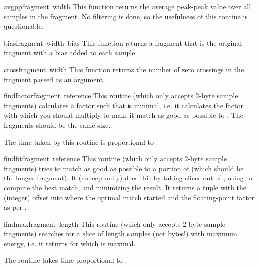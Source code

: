 \begin{funcdesc}{avgpp}{fragment\, width}
This function returns the average peak-peak value over all samples in
the fragment. No filtering is done, so the usefulness of this routine
is questionable.
\end{funcdesc}

\begin{funcdesc}{bias}{fragment\, width\, bias}
This function returns a fragment that is the original fragment with a
bias added to each sample.
\end{funcdesc}

\begin{funcdesc}{cross}{fragment\, width}
This function returns the number of zero crossings in the fragment
passed as an argument.
\end{funcdesc}

\begin{funcdesc}{findfactor}{fragment\, reference}
This routine (which only accepts 2-byte sample fragments) calculates a
factor  such that 
is minimal, i.e. it calculates the factor with which you should
multiply  to make it match as good as possible to
. The fragments should be the same size.

The time taken by this routine is proportional to . 
\end{funcdesc}

\begin{funcdesc}{findfit}{fragment\, reference}
This routine (which only accepts 2-byte sample fragments) tries to
match  as good as possible to a portion of
 (which should be the longer fragment). It
(conceptually) does this by taking slices out of , using
 to compute the best match, and minimizing the
result.
It returns a tuple  with  the
(integer) offset into  where the optimal match started
and  the floating-point factor as per .
\end{funcdesc}

\begin{funcdesc}{findmax}{fragment\, length}
This routine (which only accepts 2-byte sample fragments) searches
 for a slice of length  samples (not bytes!)
with maximum energy, i.e. it returns  for which
 is maximal.

The routine takes time proportional to .
\end{funcdesc}

